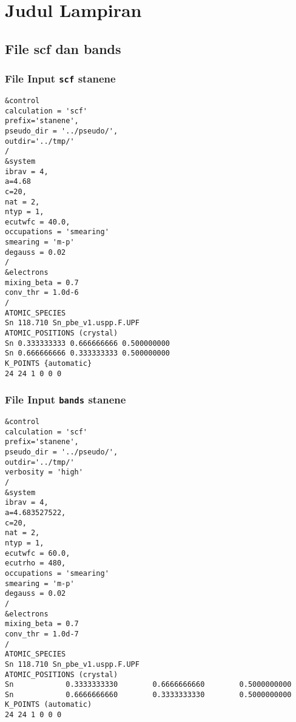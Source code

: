 
\chapter{Judul Lampiran}



\section{File scf dan bands}
\subsection{File Input \texttt{scf} stanene}
\begin{lstlisting}
&control
calculation = 'scf'
prefix='stanene',
pseudo_dir = '../pseudo/',
outdir='../tmp/'
/
&system
ibrav = 4,
a=4.68
c=20,
nat = 2,
ntyp = 1,
ecutwfc = 40.0,
occupations = 'smearing'
smearing = 'm-p'
degauss = 0.02
/
&electrons
mixing_beta = 0.7
conv_thr = 1.0d-6
/
ATOMIC_SPECIES
Sn 118.710 Sn_pbe_v1.uspp.F.UPF
ATOMIC_POSITIONS (crystal)
Sn 0.333333333 0.666666666 0.500000000
Sn 0.666666666 0.333333333 0.500000000
K_POINTS {automatic}
24 24 1 0 0 0

\end{lstlisting}

\subsection{File Input \texttt{bands} stanene}

\begin{lstlisting}
&control
calculation = 'scf'
prefix='stanene',
pseudo_dir = '../pseudo/',
outdir='../tmp/'
verbosity = 'high'
/
&system
ibrav = 4,
a=4.683527522,
c=20,
nat = 2,
ntyp = 1,
ecutwfc = 60.0,
ecutrho = 480, 
occupations = 'smearing'
smearing = 'm-p'
degauss = 0.02
/
&electrons
mixing_beta = 0.7
conv_thr = 1.0d-7
/
ATOMIC_SPECIES
Sn 118.710 Sn_pbe_v1.uspp.F.UPF
ATOMIC_POSITIONS (crystal)
Sn            0.3333333330        0.6666666660        0.5000000000
Sn            0.6666666660        0.3333333330        0.5000000000
K_POINTS (automatic)
24 24 1 0 0 0

\end{lstlisting}

